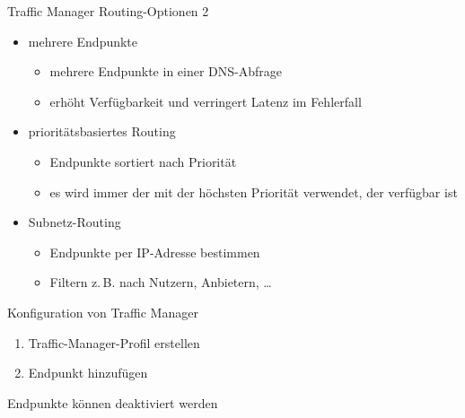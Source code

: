 \begin{flashcard}[Definition]{Traffic Manager Routing-Optionen 2}
    \begin{itemize}
        \item mehrere Endpunkte
            \begin{itemize}
                \item mehrere Endpunkte in einer DNS-Abfrage
                \item erhöht Verfügbarkeit und verringert Latenz im Fehlerfall
            \end{itemize}
        \item prioritätsbasiertes Routing
            \begin{itemize}
                \item Endpunkte sortiert nach Priorität
                \item es wird immer der mit der höchsten Priorität verwendet, der verfügbar ist
            \end{itemize}
        \item Subnetz-Routing
            \begin{itemize}
                \item Endpunkte per IP-Adresse bestimmen
                \item Filtern z.\,B. nach Nutzern, Anbietern, \ldots
            \end{itemize}
    \end{itemize}
\end{flashcard}

\begin{flashcard}[Definition]{Konfiguration von Traffic Manager}
    \begin{enumerate}
        \item Traffic-Manager-Profil erstellen
        \item Endpunkt hinzufügen
    \end{enumerate}
    \vspace{1cm}
    Endpunkte können deaktiviert werden
\end{flashcard}

